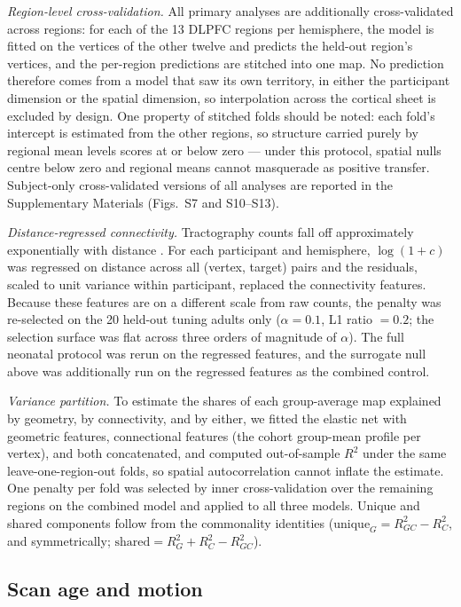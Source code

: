 \documentclass[11pt]{article}
\begin{document}
\emph{Region-level cross-validation.} All primary analyses are additionally
cross-validated across regions: for each of the 13 DLPFC regions per
hemisphere, the model is fitted on the vertices of the other twelve and
predicts the held-out region's vertices, and the per-region predictions are
stitched into one map. No prediction therefore comes from a model that saw
its own territory, in either the participant dimension or the spatial
dimension, so interpolation across the cortical sheet is excluded by design.
One property of stitched folds should be noted: each fold's intercept is
estimated from the other regions, so structure carried purely by regional
mean levels scores at or below zero --- under this protocol, spatial nulls
centre below zero and regional means cannot masquerade as positive transfer.
Subject-only cross-validated versions of all analyses are reported in the
Supplementary Materials (Figs.~S7 and S10--S13).

\emph{Distance-regressed connectivity.} Tractography counts fall off
approximately exponentially with distance \citep{donahue2016}. For each
participant and hemisphere, $\log(1+c)$ was regressed on distance across all
(vertex, target) pairs and the residuals, scaled to unit variance within
participant, replaced the connectivity features. Because these features are
on a different scale from raw counts, the penalty was re-selected on the 20
held-out tuning adults only ($\alpha = 0.1$, L1 ratio $= 0.2$; the selection
surface was flat across three orders of magnitude of $\alpha$). The full
neonatal protocol was rerun on the regressed features, and the surrogate
null above was additionally run on the regressed features as the combined
control.

\emph{Variance partition.} To estimate the shares of each group-average map
explained by geometry, by connectivity, and by either, we fitted the
elastic net with geometric features, connectional features (the cohort
group-mean profile per vertex), and both concatenated, and computed
out-of-sample $R^2$ under the same leave-one-region-out folds, so spatial
autocorrelation cannot inflate the estimate. One penalty per fold was
selected by inner cross-validation over the remaining regions on the
combined model and applied to all three models. Unique and shared components
follow from the commonality identities ($\mathrm{unique}_G = R^2_{GC} -
R^2_{C}$, and symmetrically; $\mathrm{shared} = R^2_G + R^2_C - R^2_{GC}$).

\subsection{Scan age and motion}
\end{document}

